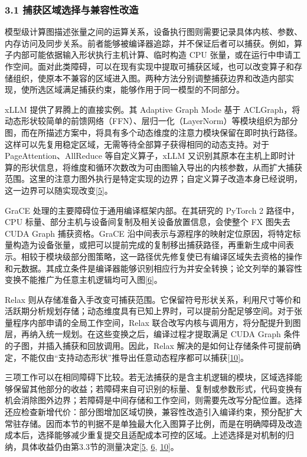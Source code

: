 \documentclass[UTF8,11pt,fontset=windows]{ctexart}
\begin{document}
\hypertarget{section-3-1}{%
\subsubsection{3.1 捕获区域选择与兼容性改造}\label{section-3-1}}

模型级计算图描述张量之间的运算关系，设备执行图则需要记录具体内核、参数、内存访问及同步关系。前者能够被编译器追踪，并不保证后者可以捕获。例如，算子内部可能依据输入形状执行主机计算、临时构造 CPU 张量，或在运行中申请工作空间。面对此类障碍，可以在现有实现中提取可捕获区域，也可以改变算子和存储组织，使原本不兼容的区域进入图。两种方法分别调整捕获边界和改造内部实现，使所选区域满足捕获约束，能够作用于同一模型的不同部分。

xLLM 提供了昇腾上的直接实例。其 Adaptive Graph Mode 基于 ACLGraph，将动态形状较简单的前馈网络（FFN）、层归一化（LayerNorm）等模块组织为部分图，而在所描述方案中，将具有多个动态维度的注意力模块保留在即时执行路径。这样可以先复用稳定区域，无需等待全部算子获得相同的动态支持。对于 PageAttention、AllReduce 等自定义算子，xLLM 又识别其原本在主机上即时计算的形状信息，将维度和循环次数改为可由图输入导出的内核参数，从而扩大捕获范围。这里的注意力图外执行是特定实现的边界；自定义算子改造本身已经说明，这一边界可以随实现改变\protect\hyperlink{ref-5}{{[}5{]}}。

GraCE 处理的主要障碍位于通用编译框架内部。在其研究的 PyTorch 2 路径中，CPU 标量、部分主机与设备间复制及相关设备放置信息，会使整个 FX 图失去 CUDA Graph 捕获资格。GraCE 沿中间表示与源程序的映射定位原因，将特定标量构造为设备张量，或把可以提前完成的复制移出捕获路径，再重新生成中间表示。相较于模块级部分图策略，这一路径优先修复使已有编译区域失去资格的操作和元数据。其成立条件是编译器能够识别相应行为并安全转换；论文列举的兼容性变换不能推广为任意主机逻辑均可入图\protect\hyperlink{ref-6}{{[}6{]}}。

Relax 则从存储准备入手改变可捕获范围。它保留符号形状关系，利用尺寸等价和活跃期分析规划存储；动态维度具有已知上界时，可以提前分配足够空间。对于张量程序内部申请的全局工作空间，Relax 联合改写内核与调用方，将分配提升到图层，再纳入统一规划。在这些变换之后，编译过程才提取满足 CUDA Graph 条件的子图，并插入捕获和回放调用。因此，Relax 解决的是如何让存储条件可提前确定，不能仅由``支持动态形状''推导出任意动态程序都可以捕获\protect\hyperlink{ref-10}{{[}10{]}}。

三项工作可以在相同障碍下比较。若无法捕获的是含主机逻辑的模块，区域选择能够保留其他部分的收益；若障碍来自可识别的标量、复制或参数形式，代码变换有机会消除图外边界；若障碍是中间存储和工作空间，则需要先改写分配位置。选择还应检查新增代价：部分图增加区域切换，兼容性改造引入编译约束，预分配扩大常驻存储。因而本节的判据不是单独最大化入图算子比例，而是在明确障碍及改造成本后，选择能够减少重复提交且适配成本可控的区域。上述选择是对机制的归纳，具体收益仍由第3.3节的测量决定\protect\hyperlink{ref-5}{{[}5}, \protect\hyperlink{ref-6}{6}, \protect\hyperlink{ref-10}{10{]}}。
\end{document}
